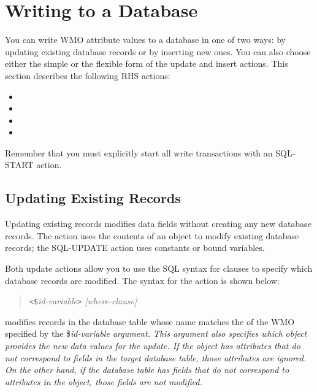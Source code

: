 \section{Writing to a Database}

You can write WMO attribute values to a database in one of two ways:
by updating existing database records or by inserting new ones. You
can also choose either the simple or the flexible form of the update
and insert actions. This section describes the following RHS actions:

\begin{itemize}
\item {}
\item {}
\item {}
\item {}
\end{itemize}

Remember that you must explicitly start all write
transactions with an SQL-START action.

\subsection{Updating Existing Records}

Updating existing records modifies data fields without creating any
new database records. The  action uses the
contents of an object to modify existing database records; the
SQL-UPDATE action uses constants or bound variables.

Both update actions allow you to use the SQL syntax for  clauses
to specify which database records are modified. The syntax for the
 action is shown below:

\begin{quote}
  \verb|<$|\it{id-variable}\verb|>| [\it{where-clause}]
\end{quote}

 modifies records in the database table
whose name matches the  of the WMO specified by the
\co\$\it{id-variable} argument. This argument also specifies which
object provides the new data values for the update. If the object has
attributes that do not correspond to fields in the target database
table, those attributes are ignored. On the other hand, if the
database table has fields that do not correspond to attributes in the
object, those fields are not modified.

